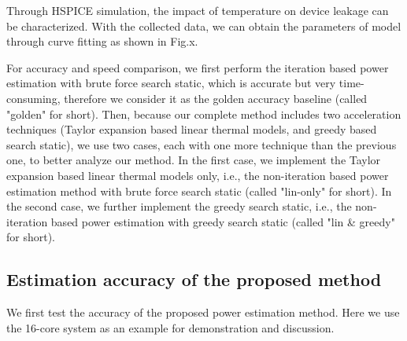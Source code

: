 Through HSPICE simulation, the impact of temperature on device leakage can be characterized. With the collected data, we can obtain the parameters of model through curve fitting as shown in Fig.x.

For accuracy and speed comparison, we first perform the iteration based power estimation with brute force search static, which is accurate but very time-consuming, therefore we consider it as the golden accuracy baseline (called "golden" for short). Then, because our complete method includes two acceleration techniques (Taylor expansion based linear thermal models, and greedy based search static), we use two cases, each with one more technique than the previous one, to better analyze our method. In the first case, we implement the Taylor expansion based linear thermal models only, i.e., the non-iteration based power estimation method with brute force search static (called "lin-only" for short). In the second case, we further implement the greedy search static, i.e., the non-iteration based power estimation with greedy search static (called "lin & greedy" for short).

\subsection{Estimation accuracy of the proposed method}
We first test the accuracy of the proposed power estimation method. Here we use the 16-core system as an example for demonstration and discussion.